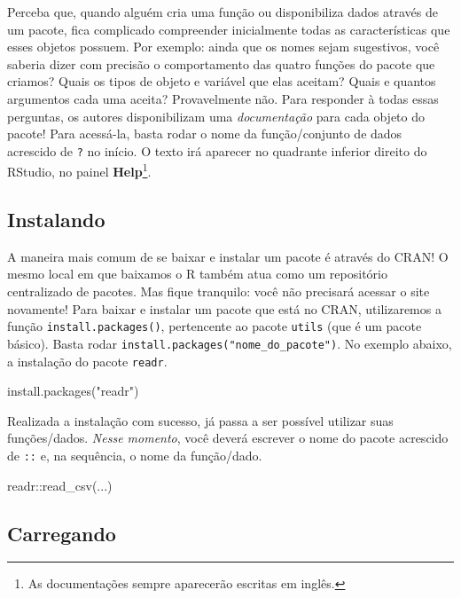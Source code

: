 \documentclass[
  letterpaper,
  DIV=11,
  numbers=noendperiod]{scrreprt}
\newenvironment{Shaded}{\begin{snugshade}}{\end{snugshade}}
\newcommand{\FunctionTok}[1]{\textcolor[rgb]{0.28,0.35,0.67}{#1}}
\newcommand{\NormalTok}[1]{\textcolor[rgb]{0.00,0.23,0.31}{#1}}
\newcommand{\SpecialCharTok}[1]{\textcolor[rgb]{0.37,0.37,0.37}{#1}}
\newcommand{\StringTok}[1]{\textcolor[rgb]{0.13,0.47,0.30}{#1}}
\begin{document}
Perceba que, quando alguém cria uma função ou disponibiliza dados
através de um pacote, fica complicado compreender inicialmente todas as
características que esses objetos possuem. Por exemplo: ainda que os
nomes sejam sugestivos, você saberia dizer com precisão o comportamento
das quatro funções do pacote que criamos? Quais os tipos de objeto e
variável que elas aceitam? Quais e quantos argumentos cada uma aceita?
Provavelmente não. Para responder à todas essas perguntas, os autores
disponibilizam uma \emph{documentação} para cada objeto do pacote! Para
acessá-la, basta rodar o nome da função/conjunto de dados acrescido de
\texttt{?} no início. O texto irá aparecer no quadrante inferior direito
do RStudio, no painel \textbf{Help}\footnote{As documentações sempre
  aparecerão escritas em inglês.}.

\subsection{Instalando}\label{instalando}

A maneira mais comum de se baixar e instalar um pacote é através do
CRAN! O mesmo local em que baixamos o R também atua como um repositório
centralizado de pacotes. Mas fique tranquilo: você não precisará acessar
o site novamente! Para baixar e instalar um pacote que está no CRAN,
utilizaremos a função \texttt{install.packages()}, pertencente ao pacote
\texttt{utils} (que é um pacote básico). Basta rodar
\texttt{install.packages("nome\_do\_pacote")}. No exemplo abaixo, a
instalação do pacote \texttt{readr}.

\begin{Shaded}
\begin{Highlighting}[]
\FunctionTok{install.packages}\NormalTok{(}\StringTok{"readr"}\NormalTok{)}
\end{Highlighting}
\end{Shaded}

Realizada a instalação com sucesso, já passa a ser possível utilizar
suas funções/dados. \emph{Nesse momento}, você deverá escrever o nome do
pacote acrescido de \texttt{::} e, na sequência, o nome da função/dado.

\begin{Shaded}
\begin{Highlighting}[]
\NormalTok{readr}\SpecialCharTok{::}\FunctionTok{read\_csv}\NormalTok{(...)}
\end{Highlighting}
\end{Shaded}

\subsection{Carregando}\label{carregando}
\end{document}
